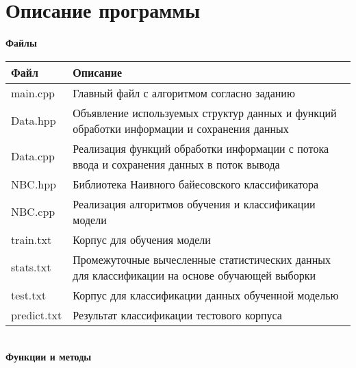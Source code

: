 
\section{Описание программы}

\textbf{Файлы} \\

\begin{tabular}{|l|m{}|}
    \hline
    Файл & Описание \\
    \hline\hline
    main.cpp & Главный файл с алгоритмом согласно заданию \\
    \hline
    Data.hpp & Объявление используемых структур данных и функций обработки информации и сохранения данных \\
    \hline
    Data.cpp & Реализация функций обработки информации с потока ввода и сохранения данных в поток вывода \\
    \hline
    NBC.hpp & Библиотека Наивного байесовского классификатора \\
    \hline
    NBC.cpp & Реализация алгоритмов обучения и классификации модели \\
    \hline
    train.txt & Корпус для обучения модели \\
    \hline
    stats.txt & Промежуточные вычесленные статистических данных для классификации на основе обучающей выборки \\
    \hline
    test.txt & Корпус для классификации данных обученной моделью \\
    \hline
    predict.txt & Результат классификации тестового корпуса \\
    \hline
\end{tabular} \\

\noindent\textbf{Функции и методы} \\

